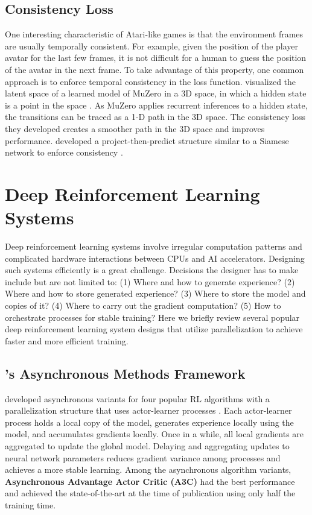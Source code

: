 \subsection{Consistency Loss}
One interesting characteristic of Atari-like games is that the environment frames are usually temporally consistent.
For example, given the position of the player avatar for the last few frames, it is not difficult for a human to guess the position of the avatar in the next frame.
To take advantage of this property, one common approach is to enforce temporal consistency in the loss function.
 visualized the latent space of a learned model of MuZero in a 3D space, in which a hidden state is a point in the space \cite{VisualizingMuZeroModels_deVries.Voskuil.ea_2021}.
As MuZero applies recurrent inferences to a hidden state, the transitions can be traced as a 1-D path in the 3D space.
The consistency loss they developed creates a smoother path in the 3D space and improves performance.
 developed a project-then-predict structure similar to a Siamese network to enforce consistency \cite{MasteringAtariGames_Ye.Liu.ea_2021,SiameseNeuralNetworks_Koch.Zemel.ea_2015}.

\section{Deep Reinforcement Learning Systems} \label{sec:drl_systems}
Deep reinforcement learning systems involve irregular computation patterns and complicated hardware interactions between CPUs and AI accelerators.
Designing such systems efficiently is a great challenge.
Decisions the designer has to make include but are not limited to:
(1) Where and how to generate experience?
(2) Where and how to store generated experience?
(3) Where to store the model and copies of it?
(4) Where to carry out the gradient computation?
(5) How to orchestrate processes for stable training?
Here we briefly review several popular deep reinforcement learning system designs that utilize parallelization to achieve faster and more efficient training.

\subsection{'s Asynchronous Methods Framework}
\citeauthor{AsynchronousMethodsDeep_Mnih.Badia.ea_2016} developed asynchronous variants for four popular RL algorithms with a parallelization structure that uses actor-learner processes \cite{AsynchronousMethodsDeep_Mnih.Badia.ea_2016}.
Each actor-learner process holds a local copy of the model, generates experience locally using the model, and accumulates gradients locally.
Once in a while, all local gradients are aggregated to update the global model.
Delaying and aggregating updates to neural network parameters reduces gradient variance among processes and achieves a more stable learning.
Among the asynchronous algorithm variants, \textbf{Asynchronous Advantage Actor Critic (A3C)} had the best performance and achieved the state-of-the-art at the time of publication using only half the training time.

